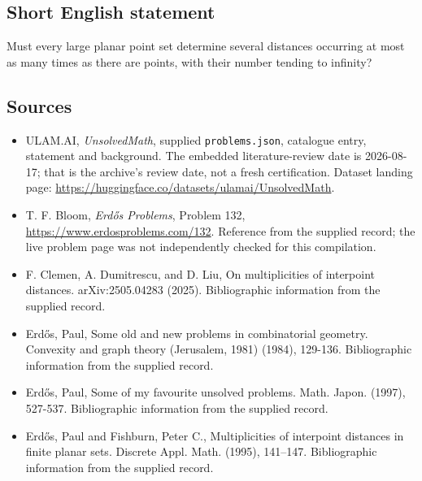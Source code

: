 \documentclass[11pt,a4paper]{article}
\begin{document}
\subsection{Short English statement}

Must every large planar point set determine several distances occurring at most as many times as there are points, with their number tending to infinity?

\subsection{Sources}

{\small

\begin{itemize}

\item[\hypertarget{source:statement:1}{S1}] ULAM.AI, \emph{UnsolvedMath}, supplied \texttt{problems.json}, catalogue entry, statement and background. The embedded literature-review date is 2026-08-17; that is the archive’s review date, not a fresh certification. Dataset landing page: \url{https://huggingface.co/datasets/ulamai/UnsolvedMath}.

\item[\hypertarget{source:statement:2}{S2}] T. F. Bloom, \emph{Erdős Problems}, Problem 132, \url{https://www.erdosproblems.com/132}. Reference from the supplied record; the live problem page was not independently checked for this compilation.

\item[\hypertarget{source:statement:3}{S3}] F. Clemen, A. Dumitrescu, and D. Liu, On multiplicities of interpoint distances. arXiv:2505.04283 (2025). Bibliographic information from the supplied record.

\item[\hypertarget{source:statement:4}{S4}] Erd\H{o}s, Paul, Some old and new problems in combinatorial geometry. Convexity and graph theory (Jerusalem, 1981) (1984), 129-136. Bibliographic information from the supplied record.

\item[\hypertarget{source:statement:5}{S5}] Erd\H{o}s, Paul, Some of my favourite unsolved problems. Math. Japon. (1997), 527-537. Bibliographic information from the supplied record.

\item[\hypertarget{source:statement:6}{S6}] Erd\H{o}s, Paul and Fishburn, Peter C., Multiplicities of interpoint distances in finite planar sets. Discrete Appl. Math. (1995), 141--147. Bibliographic information from the supplied record.

\end{itemize}

}

\label{end:statement}
\end{document}
